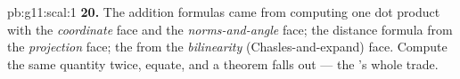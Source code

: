 \begin{solution}{pb:g11:scal:1}
\textbf{20.} The addition formulas came from computing one dot
product with the \emph{coordinate} face and the
\emph{norms-and-angle} face; the distance formula from the
\emph{projection} face; the  from the
\emph{bilinearity} (Chasles-and-expand) face. Compute the same
quantity twice, equate, and a theorem falls out --- the 's whole trade.
\end{solution}
